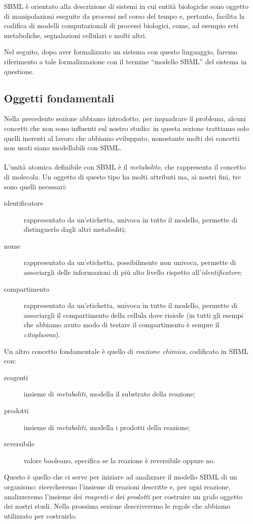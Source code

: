 SBML \`e orientato alla descrizione di sistemi in cui entit\`a
biologiche sono oggetto di manipolazioni eseguite da processi nel
corso del tempo e, pertanto, facilita la codifica di modelli
computazionali di processi biologici, come, ad esempio reti
metaboliche, segnalazioni cellulari e molti altri.

Nel seguito, dopo aver formalizzato un sistema con questo linguaggio,
faremo riferimento a tale formalizzazione con il termine ``modello
SBML'' del sistema in questione.

\subsection{Oggetti fondamentali}
\label{sec:necessaryRealObjectsModeledInSBML}

Nella precedente sezione abbiamo introdotto, per inquadrare il
problema, alcuni concetti che non sono influenti sul nostro studio: in
questa sezione trattiamo solo quelli inerenti al lavoro che abbiamo
sviluppato, nonostante molti dei concetti non usati siano modellabili
con SBML.
\\\\
L'unit\`a atomica definibile con SBML \`e il \emph{metabolito}, che
rappresenta il concetto di molecola.  Un oggetto di questo tipo ha
molti attributi ma, ai nostri fini, tre sono quelli necessari:
\begin{description}
\item[identificatore] rappresentato da un'etichetta, univoca in tutto
  il modello, permette di distinguerlo dagli altri metaboliti;
\item[nome] rappresentato da un'etichetta, possibilmente non univoca,
  permette di associargli delle informazioni di pi\`u alto livello
  rispetto all'\emph{identificatore};
\item[compartimento] rappresentato da un'etichetta, univoca in tutto
  il modello, permette di associargli il compartimento della cellula
  dove risiede (in tutti gli esempi che abbiamo avuto modo di testare
  il compartimento \`e sempre il \emph{citoplasma}).
\end{description}

Un altro concetto fondamentale \`e quello di \emph{reazione chimica},
codificato in SBML con:
\begin{description}
\item[reagenti] insieme di \emph{metaboliti}, modella il
  substrato della reazione;
\item[prodotti] insieme di \emph{metaboliti}, modella i
  prodotti della reazione;
\item[reversibile] valore booleano, specifica se la reazione \`e
  reversibile oppure no.
\end{description}
Questo \`e quello che ci serve per iniziare ad analizzare il modello
SBML di un organismo: ricercheremo l'insieme di reazioni descritte e,
per ogni reazione, analizzeremo l'insieme dei \emph{reagenti} e dei
\emph{prodotti} per costruire un grafo oggetto dei nostri studi. Nella
prossima sezione descriveremo le regole che abbiamo utilizzato per
costruirlo.


